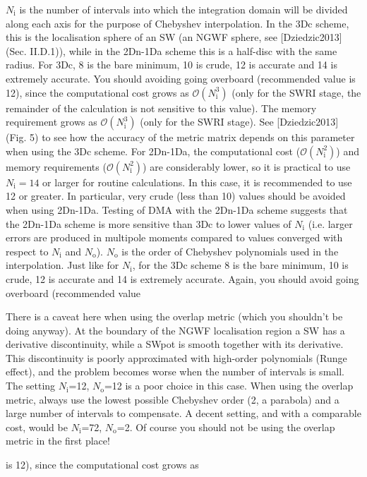 \documentclass[letterpaper,10pt,english]{sphinxmanual}
\begin{document}
\(N_{\textrm{i}}\) is the number of intervals into which the
integration domain will be divided along each axis for the purpose of
Chebyshev interpolation. In the 3Dc scheme, this is the localisation
sphere of an SW (an NGWF sphere, see
{[}Dziedzic2013{]} (Sec. II.D.1)), while in the 2Dn-1Da scheme this
is a half-disc with the same radius. For 3Dc, 8 is the bare minimum, 10
is crude, 12 is accurate and 14 is extremely accurate. You should
avoiding going overboard (recommended value is 12), since the
computational cost grows as \({\mathcal{O}}(N^3_{\textrm{i}})\)
(only for the SWRI stage, the remainder of the calculation is not
sensitive to this value). The memory requirement grows as
\({\mathcal{O}}(N^3_{\textrm{i}})\) (only for the SWRI stage). See
{[}Dziedzic2013{]} (Fig. 5) to see how the accuracy of the metric
matrix depends on this parameter when using the 3Dc scheme. For 2Dn-1Da,
the computational cost (\({\mathcal{O}}(N^{2}_{\textrm{i}})\)) and
memory requirements (\({\mathcal{O}}(N^{2}_{\textrm{i}})\)) are
considerably lower, so it is practical to use \(N_{\textrm{i}}=14\)
or larger for routine calculations. In this case, it is recommended to
use 12 or greater. In particular, very crude (less than 10) values
should be avoided when using 2Dn-1Da. Testing of DMA with the 2Dn-1Da
scheme suggests that the 2Dn-1Da scheme is more sensitive than 3Dc to
lower values of \(N_{\textrm{i}}\) (i.e. larger errors are produced
in multipole moments compared to values converged with respect to
\(N_{\textrm{i}}\) and \(N_{\textrm{o}}\)).
\(N_{\textrm{o}}\) is the order of Chebyshev polynomials used in the
interpolation. Just like for \(N_{\textrm{i}}\), for the 3Dc scheme
8 is the bare minimum, 10 is crude, 12 is accurate and 14 is extremely
accurate. Again, you should avoid going overboard (recommended
value %
\begin{footnote}[1]\sphinxAtStartFootnote
There is a caveat here when using the overlap metric (which you
shouldn’t be doing anyway). At the boundary of the NGWF localisation
region a SW has a derivative discontinuity, while a SWpot is smooth
together with its derivative. This discontinuity is poorly
approximated with high-order polynomials (Runge effect), and the
problem becomes worse when the number of intervals is small. The
setting \(N_{\textrm{i}}\)=12, \(N_{\textrm{o}}\)=12 is a
poor choice in this case. When using the overlap metric, always use
the lowest possible Chebyshev order (2, a parabola) and a large
number of intervals to compensate. A decent setting, and with a
comparable cost, would be \(N_{\textrm{i}}\)=72,
\(N_{\textrm{o}}\)=2. Of course you should not be using the
overlap metric in the first place!
%
\end{footnote} is 12), since the computational cost grows as
\end{document}
